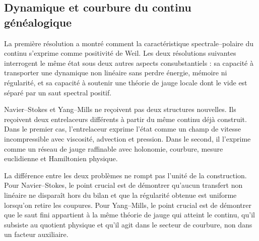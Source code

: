 \subsection{Dynamique et courbure du continu généalogique}
La première résolution a montré comment la caractéristique spectrale–polaire du continu s’exprime comme positivité de Weil. Les deux résolutions suivantes interrogent le même état sous deux autres aspects consubstantiels : sa capacité à transporter une dynamique non linéaire sans perdre énergie, mémoire ni régularité, et sa capacité à soutenir une théorie de jauge locale dont le vide est séparé par un saut spectral positif.\par
Navier–Stokes et Yang–Mills ne reçoivent pas deux structures nouvelles. Ils reçoivent deux entrelaceurs différents à partir du même continu déjà construit. Dans le premier cas, l’entrelaceur exprime l’état comme un champ de vitesse incompressible avec viscosité, advection et pression. Dans le second, il l’exprime comme un réseau de jauge raffinable avec holonomie, courbure, mesure euclidienne et Hamiltonien physique.\par
La différence entre les deux problèmes ne rompt pas l’unité de la construction. Pour Navier–Stokes, le point crucial est de démontrer qu’aucun transfert non linéaire ne disparaît hors du bilan et que la régularité obtenue est uniforme lorsqu’on retire les coupures. Pour Yang–Mills, le point crucial est de démontrer que le saut fini appartient à la même théorie de jauge qui atteint le continu, qu’il subsiste au quotient physique et qu’il agit dans le secteur de courbure, non dans un facteur auxiliaire.\par
{}
